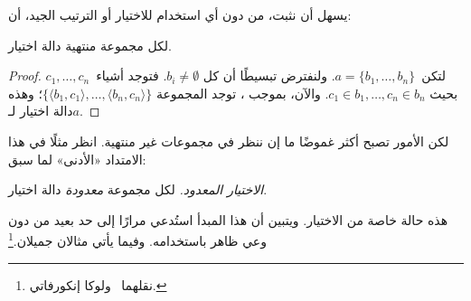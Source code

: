 \documentclass[../../../include/open-logic-section]{subfiles}
\begin{document}

يسهل أن نثبت، من دون أي استخدام للاختيار أو الترتيب الجيد، أن:

\begin{lem}[في $\Zminus$]
لكل مجموعة منتهية دالة اختيار.
\end{lem}

\begin{proof}
لتكن~$a = \{b_1, \ldots, b_n\}$. ولنفترض تبسيطًا أن كل
$b_i \neq \emptyset$. فتوجد أشياء~$c_1, \ldots, c_n$ بحيث
$c_1 \in b_1, \ldots, c_n \in b_n$. والآن، بموجب
، توجد المجموعة
$\{\langle b_1, c_1\rangle , \ldots, \langle b_n, c_n\rangle\}$؛
وهذه دالة اختيار لـ$a$.
\end{proof}

لكن الأمور تصبح أكثر غموضًا ما إن ننظر في مجموعات غير منتهية. انظر
مثلًا في هذا الامتداد «الأدنى» لما سبق:

\begin{defish}
\emph{الاختيار المعدود.} لكل مجموعة \emph{معدودة} دالة اختيار.
\end{defish}

هذه حالة خاصة من الاختيار. ويتبين أن هذا المبدأ استُدعي مرارًا إلى
حد بعيد من دون وعي ظاهر باستخدامه. وفيما يأتي مثالان
جميلان.\footnote{نقلهما~\citet[\S9.4]{Potter2004} ولوكا إنكورفاتي.}
\end{document}
